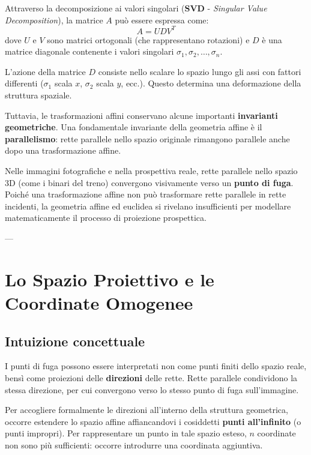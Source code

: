 Attraverso la decomposizione ai valori singolari (\textbf{SVD} - \emph{Singular Value Decomposition}), la matrice $A$ può essere espressa come:
\begin{equation}
    A = U D V^T
\end{equation}
dove $U$ e $V$ sono matrici ortogonali (che rappresentano rotazioni) e $D$ è una matrice diagonale contenente i valori singolari $\sigma_1, \sigma_2, \dots, \sigma_n$.

L'azione della matrice $D$ consiste nello scalare lo spazio lungo gli assi con fattori differenti ($\sigma_1$ scala $x$, $\sigma_2$ scala $y$, ecc.). Questo determina una deformazione della struttura spaziale. 

Tuttavia, le trasformazioni affini conservano alcune importanti \textbf{invarianti geometriche}. Una fondamentale invariante della geometria affine è il \textbf{parallelismo}: rette parallele nello spazio originale rimangono parallele anche dopo una trasformazione affine.

Nelle immagini fotografiche e nella prospettiva reale, rette parallele nello spazio 3D (come i binari del treno) convergono visivamente verso un \textbf{punto di fuga}. Poiché una trasformazione affine non può trasformare rette parallele in rette incidenti, la geometria affine ed euclidea si rivelano insufficienti per modellare matematicamente il processo di proiezione prospettica.

---

\section{Lo Spazio Proiettivo e le Coordinate Omogenee}

\subsection{Intuizione concettuale}
I punti di fuga possono essere interpretati non come punti finiti dello spazio reale, bensì come proiezioni delle \textbf{direzioni} delle rette. Rette parallele condividono la stessa direzione, per cui convergono verso lo stesso punto di fuga sull'immagine.

Per accogliere formalmente le direzioni all'interno della struttura geometrica, occorre estendere lo spazio affine affiancandovi i cosiddetti \textbf{punti all'infinito} (o punti impropri). Per rappresentare un punto in tale spazio esteso, $n$ coordinate non sono più sufficienti: occorre introdurre una coordinata aggiuntiva.

